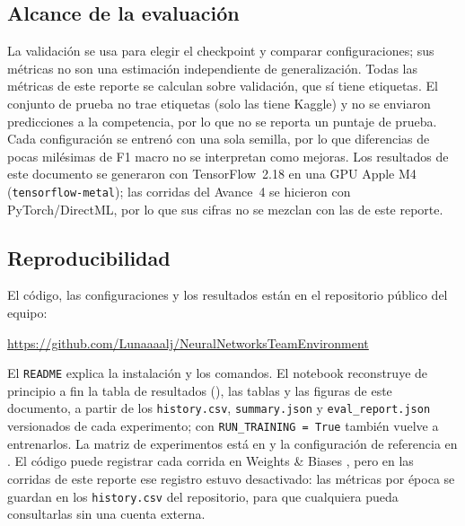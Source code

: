 \subsection{Alcance de la evaluación}

La validación se usa para elegir el checkpoint y comparar configuraciones; sus
métricas no son una estimación independiente de generalización. Todas las
métricas de este reporte se calculan sobre validación, que sí tiene etiquetas.
El conjunto de prueba no trae etiquetas (solo las tiene Kaggle) y no se enviaron
predicciones a la competencia, por lo que no se reporta un puntaje de prueba. Cada configuración se entrenó con una sola semilla,
por lo que diferencias de pocas milésimas de F1 macro no se interpretan como
mejoras. Los resultados de este documento se generaron con TensorFlow~2.18 en una
GPU Apple M4 (\texttt{tensorflow-metal}); las corridas del Avance~4 se hicieron
con PyTorch/DirectML, por lo que sus cifras no se mezclan con las de este reporte.

\subsection{Reproducibilidad}
\label{sec:repo}

El código, las configuraciones y los resultados están en el repositorio público
del equipo:
\begin{center}
\small\url{https://github.com/Lunaaaalj/NeuralNetworksTeamEnvironment}
\end{center}
El
\texttt{README} explica la instalación y los comandos. El notebook
 reconstruye de principio a fin la tabla de
resultados (), las tablas y las figuras de
este documento, a partir de los \texttt{history.csv}, \texttt{summary.json} y
\texttt{eval\_report.json} versionados de cada experimento; con
\texttt{RUN\_TRAINING = True} también vuelve a entrenarlos. La matriz de
experimentos está en  y la configuración de referencia
en .
El código puede registrar cada corrida en Weights \& Biases
\autocite{biewald2020wandb}, pero en las corridas de este reporte ese registro
estuvo desactivado: las métricas por época se guardan en los \texttt{history.csv}
del repositorio, para que cualquiera pueda consultarlas sin una cuenta externa.
